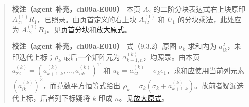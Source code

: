 \begin{quote}
\textbf{校注（agent 补充，ch09a-E009）} 本页 \(A_2\) 的二阶分块表达式右上块原印 \(A_{21}^{(1)}R_1\)，已照录。由页首定义的右上块 \(A_{12}^{(1)}\) 和 \(U_1\) 的分块乘法，此处应为 \(A_{12}^{(1)}R_1\)。见\href{verified/assets/ch09a/review-p246-initial-partition.png}{页首分块}和\href{verified/assets/ch09a/review-p246-A-2.png}{放大原式}。

\textbf{校注（agent 补充，ch09a-E010）} 式（9.3.2）原图 \(\sigma_k\) 求和内为 \(a_{ik}^2\)，未印迭代上标；\(\rho_k\) 最后一个矩阵元为 \(a_{k+1,n}^{(k)}\)，均照录。由本页 \(a_{22}^{(k)}=(a_{k+1,k}^{(k)},\ldots,a_{nk}^{(k)})^{\mathrm T}\) 和 \(u_k=a_{22}^{(k)}+\sigma_ke_1\)，求和应使用当前列元素 \((a_{ik}^{(k)})^2\)，而范数平方恒等式给出 \(\rho_k=\sigma_k(\sigma_k+a_{k+1,k}^{(k)})\)。故前者疑漏迭代上标，后者列下标疑将 \(k\) 印成 \(n\)。见\href{verified/assets/ch09a/review-p246-9-3-2.png}{放大原式}。
\end{quote}

